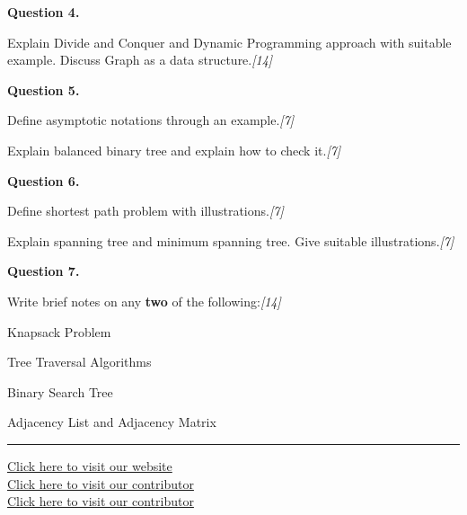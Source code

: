 \documentclass[11pt,a4paper]{article}
\newcommand{\pts}[1]{\hfill   \textit{[#1]}}
\begin{document}
\bigskip



\noindent   \textbf{Question 4.}

\begin{parts}
  \item Explain Divide and Conquer and Dynamic Programming approach with suitable example. Discuss Graph as a data structure.\pts{14}
\end{parts}

\bigskip



\noindent   \textbf{Question 5.}

\begin{parts}
  \item Define asymptotic notations through an example.\pts{7}
  \item Explain balanced binary tree and explain how to check it.\pts{7}
\end{parts}

\bigskip



\noindent   \textbf{Question 6.}

\begin{parts}
  \item Define shortest path problem with illustrations.\pts{7}
  \item Explain spanning tree and minimum spanning tree. Give suitable illustrations.\pts{7}
\end{parts}

\bigskip



\noindent   \textbf{Question 7.}



\noindent Write brief notes on any   \textbf{two} of the following:\pts{14}

\begin{parts}
  \item Knapsack Problem
  \item Tree Traversal Algorithms
  \item Binary Search Tree
  \item Adjacency List and Adjacency Matrix
\end{parts}

\vfill\rule{\linewidth}{0.4pt}

\begin{center}\small
  \href{https://www.sciqb.com/}{Click here to visit our website}\\[4pt]
  \href{https://me-aryan.vercel.app/}{Click here to visit our contributor}\\[4pt]
  \href{https://quashan-me.vercel.app/}{Click here to visit our contributor}
\end{center}
\end{document}
